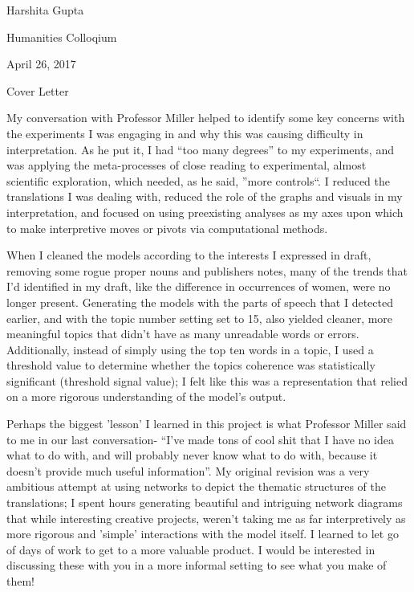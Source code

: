 \documentclass[12pt]{article}
\newenvironment{coverletter}{\begin{center} Cover Letter \end{center}}{\newpage }
\begin{document}
\begin{flushleft}


\begin{spacing}{2.0}
Harshita Gupta

Humanities Colloqium

April 26, 2017

\begin{coverletter}
\singlespacing

My conversation with Professor Miller helped to identify some key concerns with the experiments I was engaging in and why this was causing difficulty in interpretation. As he put it, I had ``too many degrees'' to my experiments, and was applying the meta-processes of close reading to experimental, almost scientific exploration, which needed, as he said, ''more controls``. I reduced the translations I was dealing with, reduced the role of the graphs and visuals in my interpretation, and focused on using preexisting analyses as my axes upon which to make interpretive moves or pivots via computational methods. 

When I cleaned the models according to the interests I expressed in draft, removing some rogue proper nouns and publishers notes, many of the trends that I'd identified in my draft, like the difference in occurrences of women, were no longer present. Generating the models with the parts of speech that I detected earlier, and with the topic number setting set to 15, also yielded cleaner, more meaningful topics that didn't have as many unreadable words or errors. Additionally, instead of simply using the top ten words in a topic, I used a threshold value to determine whether the topics coherence was statistically significant (threshold signal value); I felt like this was a representation that relied on a more rigorous understanding of the model's output.\linebreak

Perhaps the biggest 'lesson' I learned in this project is what Professor Miller said to me in our last conversation- ``I've made tons of cool shit that I have no idea what to do with, and will probably never know what to do with, because it doesn't provide much useful information''. My original revision was a very ambitious attempt at using networks to depict the thematic structures of the translations; I spent hours generating beautiful and intriguing network diagrams that while interesting creative projects, weren't taking me as far interpretively as more rigorous and 'simple' interactions with the model itself. I learned to let go of days of work to get to a more valuable product. I would be interested in discussing these with you in a more informal setting to see what you make of them!\linebreak


\end{coverletter}
\end{spacing}
\end{flushleft}
\end{document}
